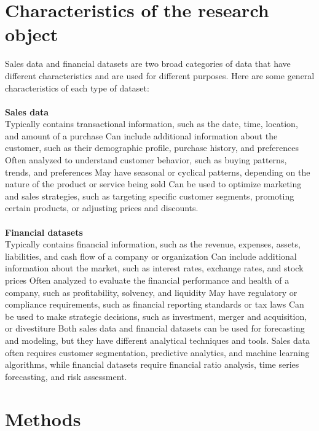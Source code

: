     \section{Characteristics of the research object} \label{subsec:research_object}
    Sales data and financial datasets are two broad categories of data that have different characteristics and are used for different purposes.
    Here are some general characteristics of each type of dataset:\\
    \\
    \textbf{Sales data}\\
    Typically contains transactional information, such as the date, time, location, and amount of a purchase
    Can include additional information about the customer, such as their demographic profile, purchase history, and preferences
    Often analyzed to understand customer behavior, such as buying patterns, trends, and preferences
    May have seasonal or cyclical patterns, depending on the nature of the product or service being sold
    Can be used to optimize marketing and sales strategies, such as targeting specific customer segments, promoting certain products, or adjusting
    prices and discounts.\\
    \\
    \textbf{Financial datasets}\\
    Typically contains financial information, such as the revenue, expenses, assets, liabilities, and cash flow of a company or organization
    Can include additional information about the market, such as interest rates, exchange rates, and stock prices
    Often analyzed to evaluate the financial performance and health of a company, such as profitability, solvency, and liquidity
    May have regulatory or compliance requirements, such as financial reporting standards or tax laws
    Can be used to make strategic decisions, such as investment, merger and acquisition, or divestiture
    Both sales data and financial datasets can be used for forecasting and modeling, but they have different analytical
    techniques and tools. Sales data often requires customer segmentation, predictive analytics, and machine learning algorithms,
    while financial datasets require financial ratio analysis, time series forecasting, and risk assessment.
    \section{Methods} \label{subsec:methods}
